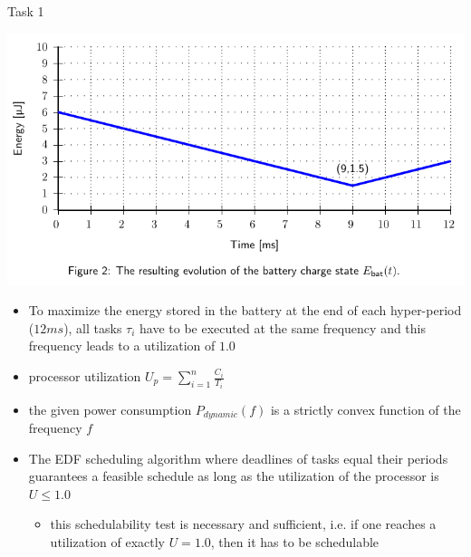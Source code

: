 \begin{frame}[allowframebreaks]{Task 1}{}
  \begin{solution}
    \centering
    \includegraphics[height=0.6\paperheight]{./figures/task1_energy.png}
  \end{solution}
  \framebreak
  \begin{tasknoinc}
    \begin{itemize}
      \item To maximize the energy stored in the battery at the end of each hyper-period ($12 ms$), all tasks $ \tau_i$ have to be executed at the same frequency and this frequency leads to a utilization of $1.0$
    \end{itemize}
  \end{tasknoinc}
  \framebreak
  \begin{requirementsnoinc}
    \begin{itemize}
      \item \alert{processor utilization} $\displaystyle U_p = \sum_{i=1}^n \frac{C_i}{T_i}$
      \item the given power consumption $P_{dynamic}(f)$ is a \alert{strictly convex} function of the frequency $f$
      \item The EDF scheduling algorithm where deadlines of tasks equal their periods guarantees a feasible schedule as long as the utilization of the processor is $U \le 1.0$
        \begin{itemize}
          \item this schedulability test is \alert{necessary} and \alert{sufficient}, i.e. if one reaches a utilization of exactly $U = 1.0$, then it has to be schedulable
        \end{itemize}
    \end{itemize}
  \end{requirementsnoinc}
  \begin{requirementsnoinc}
    \centering

\end{requirementsnoinc}
\end{frame}
